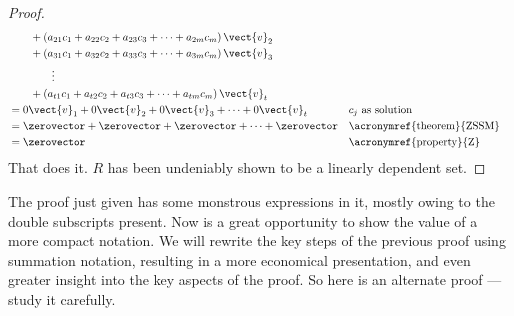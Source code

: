 \begin{proof}
\begin{align*}
%
&\quad\quad+\left(a_{21}c_{1}+a_{22}c_{2}+a_{23}c_{3}+\cdots+a_{2m}c_{m}\right)\vect{v}_2\\
&\quad\quad+\left(a_{31}c_{1}+a_{32}c_{2}+a_{33}c_{3}+\cdots+a_{3m}c_{m}\right)\vect{v}_3\\
&\quad\quad\quad\quad\vdots\\
&\quad\quad+\left(a_{t1}c_{1}+a_{t2}c_{2}+a_{t3}c_{3}+\cdots+a_{tm}c_{m}\right)\vect{v}_t\\
%
&=0\vect{v}_1+0\vect{v}_2+0\vect{v}_3+\cdots+0\vect{v}_t
&&\text{$c_j$ as solution}\\
%
&=\zerovector+\zerovector+\zerovector+\cdots+\zerovector
&&\text{\acronymref{theorem}{ZSSM}}\\
%
&=\zerovector
&&\text{\acronymref{property}{Z}}
%
\end{align*}
%
That does it.  $R$ has been undeniably shown to be a linearly dependent set.
\end{proof}
%
The proof just given has some monstrous expressions in it, mostly owing to the double subscripts present.  Now is a great opportunity to show the value of a more compact notation.  We will rewrite the key steps of the previous proof using summation notation, resulting in a more economical presentation, and even greater insight into the key aspects of the proof.  So here is an alternate proof --- study it carefully.\par\medskip
%
